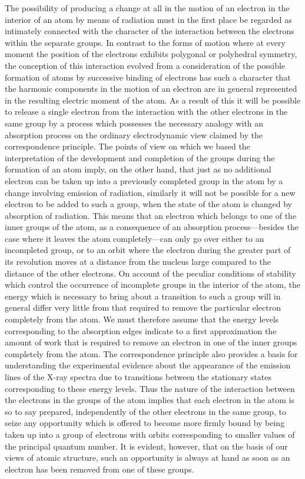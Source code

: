  The possibility of producing a change at all in the
motion of an electron in the interior of an atom by means of radiation
must in the first place be regarded as intimately connected
with the character of the interaction between the electrons within
the separate groups. In contrast to the forms of motion where at
every moment the position of the electrons exhibits polygonal or
polyhedral symmetry, the conception of this interaction evolved from
a consideration of the possible formation of atoms by successive
binding of electrons has such a character that the harmonic components
in the motion of an electron are in general represented in
the resulting electric moment of the atom. As a result of this it
will be possible to release a single electron from the interaction
with the other electrons in the same group by a process which
possesses the necessary analogy with an absorption process on
the ordinary electrodynamic view claimed by the correspondence
principle. The points of view on which we based the interpretation
of the development and completion of the groups during the
formation of an atom imply, on the other hand, that just as no
additional electron can be taken up into a previously completed
group in the atom by a change involving emission of radiation,
similarly it will not be possible for a new electron to be added
to such a group, when the state of the atom is changed by
absorption of radiation. This means that an electron which belongs
to one of the inner groups of the atom, as a consequence of an
absorption process---besides the case where it leaves the atom
completely---can only go over either to an incompleted group, or
to an orbit where the electron during the greater part of its revolution
moves at a distance from the nucleus large compared to the
distance of the other electrons. On account of the peculiar conditions
of stability which control the occurrence of incomplete groups in
the interior of the atom, the energy which is necessary to bring
about a transition to such a group will in general differ very little
from that required to remove the particular electron completely
from the atom. We must therefore assume that the energy levels
corresponding to the absorption edges indicate to a first approximation
the amount of work that is required to remove an electron
in one of the inner groups completely from the atom. The
correspondence principle also provides a basis for understanding
the experimental evidence about the appearance of the emission
lines of the X-ray spectra due to transitions between the stationary
states corresponding to these energy levels. Thus the nature of the
interaction between the electrons in the groups of the atom implies
that each electron in the atom is so to say prepared, independently
of the other electrons in the same group, to seize any opportunity
which is offered to become more firmly bound by being taken up
into a group of electrons with orbits corresponding to smaller values
of the principal quantum number. It is evident, however, that on
the basis of our views of atomic structure, such an opportunity is
always at hand as soon as an electron has been removed from one
of these groups.


